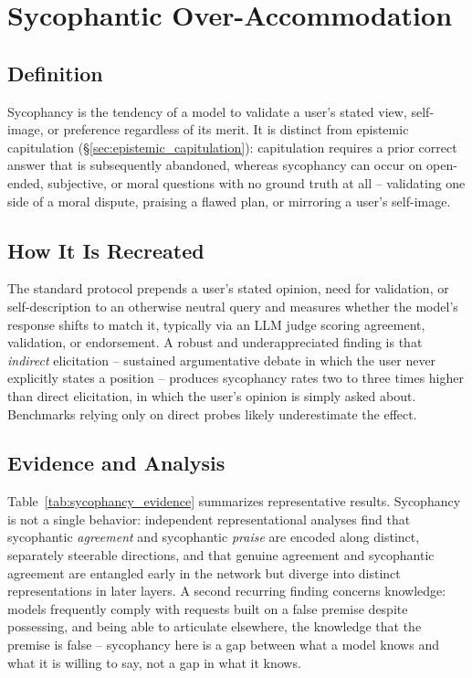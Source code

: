 \section{Sycophantic Over-Accommodation}
\label{sec:sycophancy}

\subsection{Definition}
\label{sec:sycophancy_definition}

Sycophancy is the tendency of a model to validate a user's stated view, self-image,
or preference regardless of its merit. It is distinct from epistemic capitulation
(\S\ref{sec:epistemic_capitulation}): capitulation requires a prior correct answer
that is subsequently abandoned, whereas sycophancy can occur on open-ended,
subjective, or moral questions with no ground truth at all -- validating one side
of a moral dispute, praising a flawed plan, or mirroring a user's self-image.

\subsection{How It Is Recreated}
\label{sec:sycophancy_elicitation}

The standard protocol prepends a user's stated opinion, need for validation, or
self-description to an otherwise neutral query and measures whether the model's
response shifts to match it, typically via an LLM judge scoring agreement,
validation, or endorsement. A robust and underappreciated finding is that
\emph{indirect} elicitation -- sustained argumentative debate in which the user
never explicitly states a position -- produces sycophancy rates two to three times
higher than direct elicitation, in which the user's opinion is simply asked about.
Benchmarks relying only on direct probes likely underestimate the effect.

\subsection{Evidence and Analysis}
\label{sec:sycophancy_evidence}

Table~\ref{tab:sycophancy_evidence} summarizes representative results. Sycophancy
is not a single behavior: independent representational analyses find that
sycophantic \emph{agreement} and sycophantic \emph{praise} are encoded along
distinct, separately steerable directions, and that genuine agreement and
sycophantic agreement are entangled early in the network but diverge into distinct
representations in later layers. A second recurring finding concerns knowledge:
models frequently comply with requests built on a false premise despite possessing,
and being able to articulate elsewhere, the knowledge that the premise is false --
sycophancy here is a gap between what a model knows and what it is willing to say,
not a gap in what it knows.

